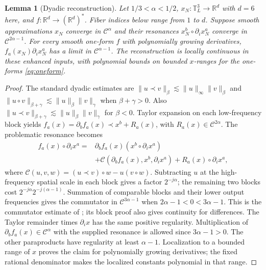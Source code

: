 \documentclass[11pt]{article}
\newtheorem{lemma}[theorem]{Lemma}
\newcommand{\T}{\mathbb T}
\newcommand{\R}{\mathbb R}
\begin{document}
\begin{lemma}[Dyadic reconstruction]\label{lem:reconstruct}
Let $1/3<\alpha<1/2$, $x_N:\T_L^3\to\R^d$ with $d=6$ here, and
$f:\R^d\to(\R^d)^*$. Fiber indices below range from $1$ to $d$.
Suppose smooth approximations $x_N$ converge in
$\mathcal C^\alpha$ and their resonances
$x_N^b\circ\partial_i x_N^a$ converge in $\mathcal C^{2\alpha-1}$.
For every smooth one-form $f$ with polynomially growing derivatives,
$f_a(x_N)\partial_i x_N^a$ has a limit in $\mathcal C^{\alpha-1}$.
The reconstruction is locally continuous in these enhanced inputs, with
polynomial bounds on bounded $x$-ranges for the one-forms \eqref{eq:oneform}.
\end{lemma}
\begin{proof}
The standard dyadic estimates are
$\|u\prec v\|_\beta\lesssim\|u\|_\infty\|v\|_\beta$ and
$\|u\circ v\|_{\beta+\gamma}\lesssim\|u\|_\beta\|v\|_\gamma$
when $\beta+\gamma>0$. Also
$\|u\prec v\|_{\beta+\gamma}\lesssim\|u\|_\beta\|v\|_\gamma$
for $\beta<0$. Taylor expansion on each low-frequency block yields
$f_a(x)=\partial_bf_a(x)\prec x^b+R_a(x)$, with
$R_a(x)\in\mathcal C^{2\alpha}$. The problematic resonance becomes
\begin{align*}
 f_a(x)\circ\partial_i x^a
 ={}&\partial_b f_a(x)(x^b\circ\partial_i x^a)\\
 &+\mathcal C(\partial_bf_a(x),x^b,\partial_i x^a)
       +R_a(x)\circ\partial_i x^a,
\end{align*}
where $\mathcal C(u,v,w)=(u\prec v)\circ w-u(v\circ w)$.
Subtracting $u$ at the high-frequency spatial scale in each block gives a
factor $2^{-j\alpha}$; the remaining two blocks cost
$2^{-j\alpha}2^{-j(\alpha-1)}$. Summation of comparable blocks and their
lower output frequencies gives the commutator in
$\mathcal C^{3\alpha-1}$ when $2\alpha-1<0<3\alpha-1$.
This is the commutator estimate of \cite[Lemma 2.4]{GIP}; its block proof
also gives continuity for differences. The Taylor remainder times
$\partial_i x$ has the same positive regularity. Multiplication of
$\partial_bf_a(x)\in\mathcal C^\alpha$ with the supplied resonance is
allowed since $3\alpha-1>0$. The other paraproducts have regularity at
least $\alpha-1$. Localization to a bounded range of $x$ proves the
claim for polynomially growing derivatives; the fixed rational denominator
makes the localized constants polynomial in that range.
\end{proof}
\end{document}
